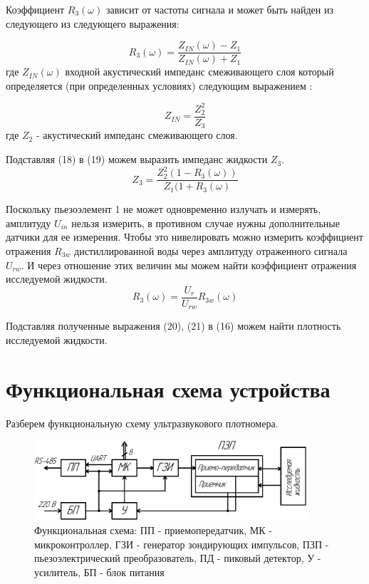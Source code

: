\documentclass[russian, utf8, 12pt]{eskdtext}
\begin{document}
Коэффициент $R_3(\omega)$ зависит от частоты сигнала и может быть найден из следующего из следующего выражения: 

\begin{equation}
	R_3(\omega) = \frac{Z_{IN}(\omega) - Z_1}{Z_{IN}(\omega) + Z_1}
\end{equation}
где $Z_{IN}(\omega)$ входной акустический импеданс смеживающего слоя который определяется (при определенных условиях) следующим выражением : 

\begin{equation}
	Z_{IN} = \frac{Z^2_2}{Z_3}
\end{equation}
где $Z_2$ - акустический импеданс смеживающего слоя.

Подставляя (18) в (19) можем выразить импеданс жидкости $Z_3$.
\begin{equation}
	Z_3 = \frac{Z_2^2 (1 - R_3(\omega))}{Z_1 (1 + R_3(\omega)}
\end{equation}

Поскольку пьезоэлемент 1 не может одновременно излучать и измерять, амплитуду $U_{in}$ нельзя измерить, в противном случае нужны дополнительные датчики для ее измерения. Чтобы это нивелировать можно измерить коэффициент отражения $R_{3w}$ дистиллированной воды через амплитуду отраженного сигнала $U_{rw}$. И через отношение этих величин мы можем найти коэффициент отражения исследуемой жидкости.
\begin{equation}
	R_3(\omega) = \frac{U_r}{U_{rw}} R_{3w}(\omega)
\end{equation}

Подставляя полученные выражения (20), (21) в (16) можем найти плотность исследуемой жидкости.

\newpage
\section{Функциональная схема устройства}

Разберем функциональную схему ультразвукового плотномера.
\begin{figure}[h!]
	\begin{center}
	\includegraphics[width = 0.9\textwidth] {FuncScheme.pdf}
	\end{center}
	\caption{Функциональная схема: ПП - приемопередатчик, МК - микроконтроллер, ГЗИ - генератор зондирующих импульсов, ПЗП - пьезоэлектрический преобразователь, ПД - пиковый детектор, У - усилитель, БП - блок питания}
\end{figure}
\end{document}

